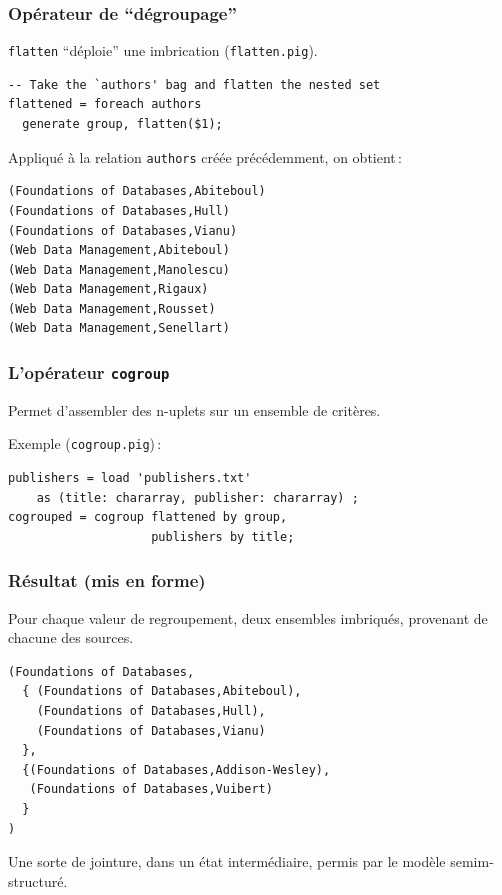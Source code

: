 \begin{frame}[fragile]
\frametitle{Opérateur de ``dégroupage''}

\texttt{flatten} ``déploie'' une imbrication (\texttt{flatten.pig}).

\begin{lstlisting}[language=pig]
-- Take the `authors' bag and flatten the nested set
flattened = foreach authors  
  generate group, flatten($1);
\end{lstlisting}

\vfill

Appliqué à la relation  \texttt{authors} créée précédemment, on obtient\,:


\small\begin{verbatim}
(Foundations of Databases,Abiteboul)
(Foundations of Databases,Hull)
(Foundations of Databases,Vianu)
(Web Data Management,Abiteboul)
(Web Data Management,Manolescu)
(Web Data Management,Rigaux)
(Web Data Management,Rousset)
(Web Data Management,Senellart)
\end{verbatim}
\end{frame}


\begin{frame}[fragile]
\frametitle{L'opérateur \texttt{cogroup}}

\vfill
Permet d'assembler des n-uplets sur un ensemble de critères.

\vfill
Exemple (\texttt{cogroup.pig})\,:

\begin{lstlisting}[language=pig]
publishers = load 'publishers.txt' 
    as (title: chararray, publisher: chararray) ;
cogrouped = cogroup flattened by group,
                    publishers by title;
\end{lstlisting}

\end{frame}


\begin{frame}[fragile]
\frametitle{Résultat (mis en forme)}
\vfill
Pour chaque valeur de regroupement, deux ensembles imbriqués,
provenant de chacune des sources.

\vfill

{\small\begin{verbatim}
(Foundations of Databases,
  { (Foundations of Databases,Abiteboul),
    (Foundations of Databases,Hull),
    (Foundations of Databases,Vianu)
  },
  {(Foundations of Databases,Addison-Wesley),
   (Foundations of Databases,Vuibert)
  }
)
\end{verbatim}
}

\vfill
Une sorte de jointure, dans un état intermédiaire, permis par le modèle semim-structuré.

\end{frame}


